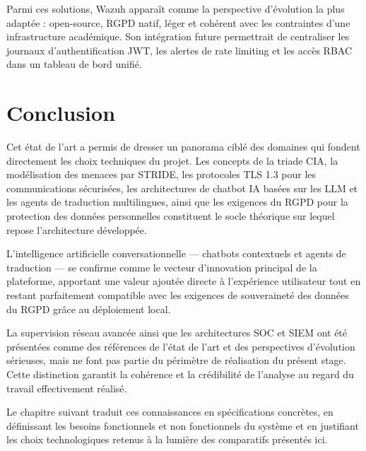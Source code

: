 Parmi ces solutions, Wazuh apparaît comme la perspective d'évolution la plus adaptée : open-source, RGPD natif, léger et cohérent avec les contraintes d'une infrastructure académique. Son intégration future permettrait de centraliser les journaux d'authentification JWT, les alertes de rate limiting et les accès RBAC dans un tableau de bord unifié.

\section*{Conclusion}
Cet état de l'art a permis de dresser un panorama ciblé des domaines qui fondent directement les choix techniques du projet. Les concepts de la triade CIA, la modélisation des menaces par STRIDE, les protocoles TLS 1.3 pour les communications sécurisées, les architectures de chatbot IA basées sur les LLM et les agents de traduction multilingues, ainsi que les exigences du RGPD pour la protection des données personnelles constituent le socle théorique sur lequel repose l'architecture développée.

L'intelligence artificielle conversationnelle — chatbots contextuels et agents de traduction — se confirme comme le vecteur d'innovation principal de la plateforme, apportant une valeur ajoutée directe à l'expérience utilisateur tout en restant parfaitement compatible avec les exigences de souveraineté des données du RGPD grâce au déploiement local.

La supervision réseau avancée ainsi que les architectures SOC et SIEM ont été présentées comme des références de l'état de l'art et des perspectives d'évolution sérieuses, mais ne font pas partie du périmètre de réalisation du présent stage. Cette distinction garantit la cohérence et la crédibilité de l'analyse au regard du travail effectivement réalisé.

Le chapitre suivant traduit ces connaissances en spécifications concrètes, en définissant les besoins fonctionnels et non fonctionnels du système et en justifiant les choix technologiques retenus à la lumière des comparatifs présentés ici.
